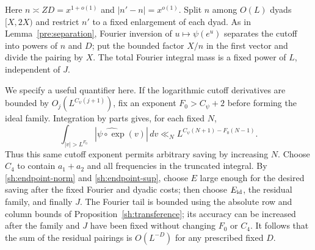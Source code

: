 Here $n\asymp ZD=x^{1+o(1)}$ and $|n'-n|=x^{o(1)}$.  Split
$n$ among $O(L)$ dyads $[X,2X)$ and restrict $n'$ to a fixed
enlargement of each dyad.  As in Lemma~\ref{pre:separation}, Fourier inversion of
$u\mapsto\psi(e^u)$ separates the cutoff into powers of $n$ and
$D$; put the bounded factor $X/n$ in the first vector and divide
the pairing by $X$.  The total Fourier integral mass is a fixed
power of $L$, independent of $J$.

We specify a useful quantifier here.  If the logarithmic cutoff
derivatives are bounded by $O_j(L^{C_\psi(j+1)})$, fix an exponent
$F_0>C_\psi+2$ before forming the ideal family.  Integration by
parts gives, for each fixed $N$,
\[
 \int_{|v|>L^{F_0}}|\widehat{\psi\circ\exp}(v)|\,dv
 \ll_N L^{C_\psi(N+1)-F_0(N-1)}.
\]
Thus this same cutoff exponent permits arbitrary saving by increasing
$N$.  Choose $C_4$ to contain $a_1+a_2$ and all frequencies in the
truncated integral.  By \eqref{sh:endpoint-norm} and
\eqref{sh:endpoint-sup}, choose $E$ large enough for the desired
saving after the fixed Fourier and dyadic costs; then choose
$E_{\rm id}$, the residual family, and finally $J$.  The Fourier
tail is bounded using the absolute row and column bounds of
Proposition~\ref{sh:transference}; its accuracy can be increased
after the family and $J$ have been fixed without changing $F_0$ or
$C_4$.  It follows that the sum of the residual pairings is
$O(L^{-D})$ for any prescribed fixed $D$.

